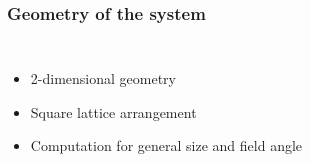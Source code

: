    \begin{frame}[t]
        \frametitle{Geometry of the system}
        
        \begin{columns}[t]
                \begin{itemize}
                    \item 2-dimensional geometry \pause
                    \item Square lattice arrangement \pause
                    \item Computation for general size and field angle
                \end{itemize}
    
            \onslide
                \vspace{0.0cm}
    
        \end{columns}

        \onslide %
    \end{frame}